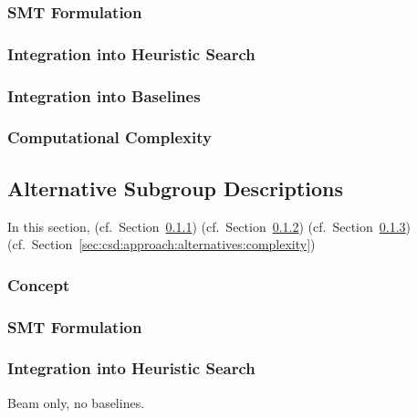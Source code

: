 \documentclass{article}
\theoremstyle{definition}
\begin{document}
\subsubsection{SMT Formulation}
\label{sec:csd:approach:cardinality:smt}

\subsubsection{Integration into Heuristic Search}
\label{sec:csd:approach:cardinality:heuristics}

\subsubsection{Integration into Baselines}
\label{sec:csd:approach:cardinality:baselines}

\subsubsection{Computational Complexity}
\label{sec:csd:approach:cardinality:complexity}

\subsection{Alternative Subgroup Descriptions}
\label{sec:csd:approach:alternatives}

In this section, (cf.~Section~\ref{sec:csd:approach:alternatives:concept}) (cf.~Section~\ref{sec:csd:approach:alternatives:smt}) (cf.~Section~\ref{sec:csd:approach:alternatives:heuristics}) (cf.~Section~\ref{sec:csd:approach:alternatives:complexity})

\subsubsection{Concept}
\label{sec:csd:approach:alternatives:concept}

\subsubsection{SMT Formulation}
\label{sec:csd:approach:alternatives:smt}

\subsubsection{Integration into Heuristic Search}
\label{sec:csd:approach:alternatives:heuristics}

Beam only, no baselines.
\end{document}
